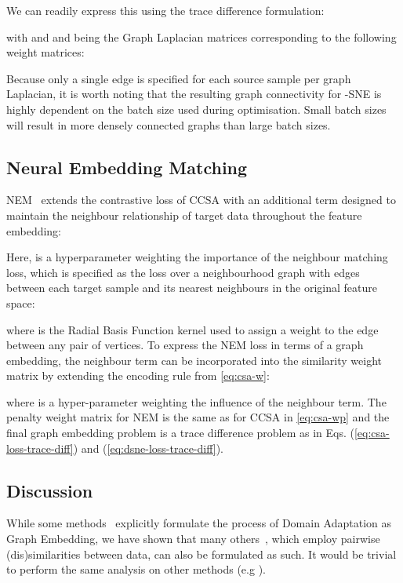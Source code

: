 \documentclass[journal]{IEEEtran}
\begin{document}
We can readily express this using the trace difference formulation:

with  and  and  being the Graph Laplacian matrices corresponding to the following weight matrices:

Because only a single edge is specified for each source sample per graph Laplacian, it is worth noting that the resulting graph connectivity for -SNE is highly dependent on the batch size used during optimisation. Small batch sizes will result in more densely connected graphs than large batch sizes.




\subsection{Neural Embedding Matching} \label{sec:dage-nem}
NEM~\cite{wang2019nem} extends the contrastive loss of CCSA with an additional term designed to maintain the neighbour relationship of target data throughout the feature embedding:

Here,  is a hyperparameter weighting the importance of the neighbour matching loss, which is specified as the loss over a neighbourhood graph with edges between each target sample  and its  nearest neighbours  in the original feature space: 

where 
 is the Radial Basis Function kernel used to assign a weight to the edge between any pair of vertices.
To express the NEM loss in terms of a graph embedding, the neighbour term can be incorporated into the similarity weight matrix by extending the encoding rule from \cref{eq:csa-w}:

where  is a hyper-parameter weighting the influence of the neighbour term.
The penalty weight matrix for NEM is the same as for CCSA in \cref{eq:csa-wp} and the final graph embedding problem is a trace difference problem as in Eqs. (\ref{eq:csa-loss-trace-diff}) and (\ref{eq:dsne-loss-trace-diff}). \subsection{Discussion} \label{sec:discussion}

While some methods~\cite{ghifary2017sca, chen2019gef, hedegaard2020supervised} explicitly formulate the process of Domain Adaptation as Graph Embedding, we have shown that many others~\cite{motiian2017ccsa, xu2019dsne, wang2019nem}, which employ pairwise (dis)similarities between data, can also be formulated as such. It would be trivial to perform the same analysis on other methods (e.g \cite{koniusz2017domain}).
\end{document}
